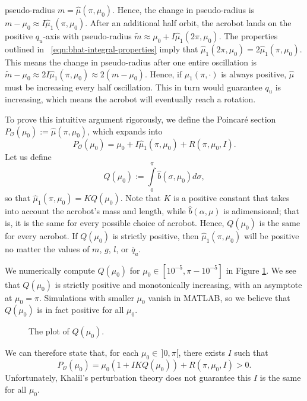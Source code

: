 pseudo-radius \(m = \hat{\mu}(\pi,\mu_0)\).
Hence, the change in pseudo-radius is 
\(m - \mu_0 \approx I\hat{\mu}_1(\pi,\mu_0)\).
After an additional half orbit, the acrobot lands on the positive \(q_u\)-axis
with pseudo-radius
\(\tilde{m} \approx \mu_0 + I\hat{\mu}_1(2\pi,\mu_0)\).
The properties outlined in ~\eqref{eqn:bhat-integral-properties} imply that
\(\hat{\mu}_1(2\pi,\mu_0) = 2 \hat{\mu}_1(\pi,\mu_0)\). 
This means the change in pseudo-radius after one entire oscillation is 
\(\tilde{m} - \mu_0 \approx 2I\hat{\mu}_1(\pi,\mu_0) \approx 2 (m - \mu_0)\).
Hence, if \(\hat{\mu}_1(\pi,\cdot)\) is always positive,
\(\hat{\mu}\) must be increasing every half oscillation.
This in turn would guarantee \(q_u\) is increasing, which means the acrobot
will eventually reach a rotation.

To prove this intuitive argument rigorously, we define the Poincar\'{e} section
\(P_\mathcal{O}(\mu_0) := \hat{\mu}(\pi,\mu_0)\), which expands into
\[
    P_\mathcal{O}(\mu_0) = \mu_0 + I \hat{\mu}_1(\pi,\mu_0) + R(\pi,\mu_0,I)
    .
\]
Let us define
\[
    Q(\mu_0) := \int \limits_0^\pi \hat{b}(\sigma,\mu_0)d\sigma
    ,
\]
so that \(\hat{\mu}_1(\pi,\mu_0) = K Q(\mu_0)\).
Note that \(K\) is a positive constant that takes into account the acrobot's
mass and length, while \(\hat{b}(\alpha,\mu)\) is adimensional;
that is, it is the same for every possible choice of acrobot.
Hence, \(Q(\mu_0)\) is the same for every acrobot.
If \(Q(\mu_0)\) is strictly positive, then \(\hat{\mu}_1(\pi,\mu_0)\) will be
positive no matter the values of \(m\), \(g\), \(l\), or \(\bar{q}_a\).

We numerically compute \(Q(\mu_0)\) for \(\mu_0 \in [10^{-5}, \pi - 10^{-5}]\)
in Figure \ref{fig:acrobot-Q}. 
We see that \(Q(\mu_0)\) is strictly positive and monotonically increasing, with
an asymptote at \(\mu_0 = \pi\). 
Simulations with smaller \(\mu_0\) vanish in MATLAB, so we believe that 
\(Q(\mu_0)\) is in fact positive for all \(\mu_0\).

\begin{figure}
    \centering
    \caption{The plot of \(Q(\mu_0)\).}
    \label{fig:acrobot-Q}
\end{figure}

We can therefore state that, for each \(\mu_0 \in \, ]0,\pi[\), there exists
\(I\) such that
\[
    P_\mathcal{O}(\mu_0) = \mu_0\left(1+ IKQ(\mu_0)\right) + R(\pi,\mu_0,I) > 0
    .
\]
Unfortunately, Khalil's perturbation theory does not guarantee this \(I\) is the
same for all \(\mu_0\). 

